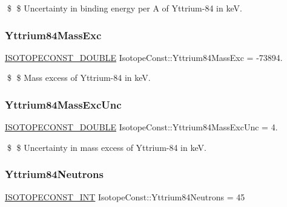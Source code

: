 \$ \$ Uncertainty in binding energy per A of Yttrium-\/84 in keV. \mbox{\label{group___isotope_const-_yttrium-_y84_ga753272d716ee96b38a3ece1768b82ed3}} 
\subsubsection{\texorpdfstring{Yttrium84\+Mass\+Exc}{Yttrium84MassExc}}
{\footnotesize\ttfamily \mbox{\hyperlink{group___isotope_const-_macros_ga8f45a7272ce02c0b4c65c44636ed719a}{I\+S\+O\+T\+O\+P\+E\+C\+O\+N\+S\+T\+\_\+\+D\+O\+U\+B\+LE}} Isotope\+Const\+::\+Yttrium84\+Mass\+Exc = -\/73894.}

\$ \$ Mass excess of Yttrium-\/84 in keV. \mbox{\label{group___isotope_const-_yttrium-_y84_ga765119ab713304c1e692739627ac6bd4}} 
\subsubsection{\texorpdfstring{Yttrium84\+Mass\+Exc\+Unc}{Yttrium84MassExcUnc}}
{\footnotesize\ttfamily \mbox{\hyperlink{group___isotope_const-_macros_ga8f45a7272ce02c0b4c65c44636ed719a}{I\+S\+O\+T\+O\+P\+E\+C\+O\+N\+S\+T\+\_\+\+D\+O\+U\+B\+LE}} Isotope\+Const\+::\+Yttrium84\+Mass\+Exc\+Unc = 4.}

\$ \$ Uncertainty in mass excess of Yttrium-\/84 in keV. \mbox{\label{group___isotope_const-_yttrium-_y84_gafd8fc9c7930ae6be9f7268813fbf6ed8}} 
\subsubsection{\texorpdfstring{Yttrium84\+Neutrons}{Yttrium84Neutrons}}
{\footnotesize\ttfamily \mbox{\hyperlink{group___isotope_const-_macros_ga5f18360b3e99483a35c32d789e62621c}{I\+S\+O\+T\+O\+P\+E\+C\+O\+N\+S\+T\+\_\+\+I\+NT}} Isotope\+Const\+::\+Yttrium84\+Neutrons = 45}

